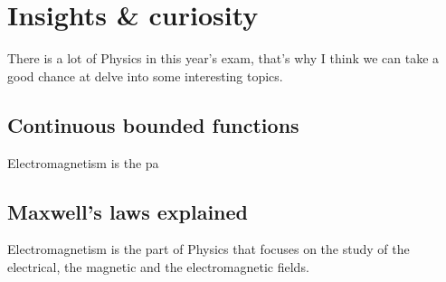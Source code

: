 \chapter[Insights \& curiosity]{Insights \& curiosity}
\label{ch:insights}
There is a lot of Physics in this year's exam, that's why I think we can
take a good chance at delve into some interesting topics.

\section{Continuous bounded functions}
\label{sec:contbound}
Electromagnetism is the pa

\section{Maxwell's laws explained}
\label{sec:maxwell}
Electromagnetism is the part of Physics that focuses on the study of the
electrical, the magnetic and the electromagnetic fields.
